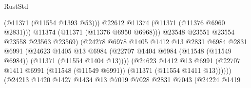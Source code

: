\begin{lexlean}{RustStd}
\begin{coremodule}
                                                (@11371 (@11554 @1393 @53)))
                                              @22612
                                              @11374
                                              (@11371 (@11376 @6960 @2831)))
                                            @11374
                                            (@11371 (@11376 @6950 @6968)))
                                          @23548
                                          @23551
                                          @23554
                                          @23558
                                          @23563
                                          @23569)
                                        (@24278
                                          @6978
                                          @1405
                                          @1412
                                          @13
                                          @2831
                                          @6984
                                          @2831
                                          @6991
                                          (@24623
                                            @1405
                                            @13
                                            @6984
                                            (@22707
                                              @1404
                                              @6984
                                              (@11548 (@11549 @6984))
                                              (@11371 (@11554 @1404 @13))))
                                          (@24623
                                            @1412
                                            @13
                                            @6991
                                            (@22707
                                              @1411
                                              @6991
                                              (@11548 (@11549 @6991))
                                              (@11371 (@11554 @1411 @13))))))
                                      (@24213
                                        @1420
                                        @1427
                                        @1434
                                        @13
                                        @7019
                                        @7028
                                        @2831
                                        @7043
                                        (@24224
                                          @1419

\end{coremodule}
\end{lexlean}
